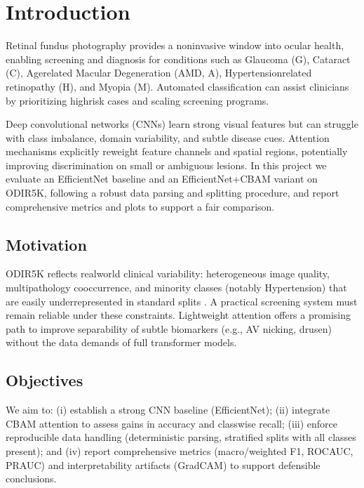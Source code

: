 \chapter{Introduction}
Retinal fundus photography provides a non\textendash invasive window into ocular health, enabling screening and diagnosis for conditions such as Glaucoma (G), Cataract (C), Age\textendash related Macular Degeneration (AMD, A), Hypertension\textendash related retinopathy (H), and Myopia (M). Automated classification can assist clinicians by prioritizing high\textendash risk cases and scaling screening programs.

Deep convolutional networks (CNNs) learn strong visual features but can struggle with class imbalance, domain variability, and subtle disease cues. Attention mechanisms explicitly reweight feature channels and spatial regions, potentially improving discrimination on small or ambiguous lesions. In this project we evaluate an EfficientNet baseline and an EfficientNet+CBAM variant on ODIR\textendash 5K, following a robust data parsing and splitting procedure, and report comprehensive metrics and plots to support a fair comparison.

\section{Motivation}
ODIR\textendash 5K reflects real\textendash world clinical variability: heterogeneous image quality, multi\textendash pathology co\textendash occurrence, and minority classes (notably Hypertension) that are easily under\textendash represented in standard splits \cite{odir5k}. A practical screening system must remain reliable under these constraints. Lightweight attention offers a promising path to improve separability of subtle biomarkers (e.g., AV nicking, drusen) without the data demands of full transformer models.

\section{Objectives}
We aim to: (i) establish a strong CNN baseline (EfficientNet); (ii) integrate CBAM attention to assess gains in accuracy and class\textendash wise recall; (iii) enforce reproducible data handling (deterministic parsing, stratified splits with all classes present); and (iv) report comprehensive metrics (macro/weighted F1, ROC\textendash AUC, PR\textendash AUC) and interpretability artifacts (Grad\textendash CAM) to support defensible conclusions.

